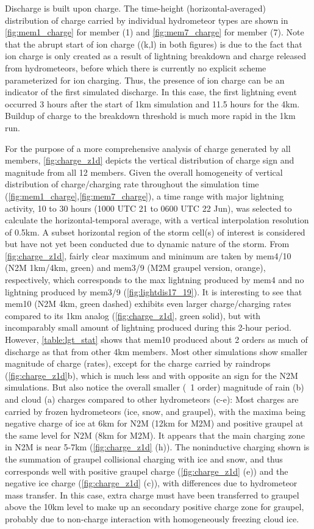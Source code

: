 Discharge is built upon charge. The time-height (horizontal-averaged) distribution of charge carried by individual hydrometeor types are shown in \ref{fig:mem1_charge} for member (1) and \ref{fig:mem7_charge} for member (7). Note that the abrupt start of ion charge ((k,l) in both figures) is due to the fact that ion charge is only created as a result of lightning breakdown and charge released from hydrometeors, before which there is currently no explicit scheme parameterized for ion charging. Thus, the presence of ion charge can be an indicator of the first simulated discharge. In this case, the first lightning event occurred 3 hours after the start of 1km simulation and 11.5 hours for the 4km. Buildup of charge to the breakdown threshold is much more rapid in the 1km run.

For the purpose of a more comprehensive analysis of charge generated by all members, \ref{fig:charge_z1d} depicts the vertical distribution of charge sign and magnitude from all 12 members. Given the overall homogeneity of vertical distribution of charge/charging rate throughout the simulation time (\ref{fig:mem1_charge},\ref{fig:mem7_charge}), a time range with major lightning activity, 10 to 30 hours (1000 UTC 21 to 0600 UTC 22 Jun), was selected to calculate the horizontal-temporal average, with a vertical interpolation resolution of 0.5km. A subset horizontal region of the storm cell(s) of interest is considered but have not yet been conducted due to dynamic nature of the storm. From \ref{fig:charge_z1d}, fairly clear maximum and minimum are taken by mem4/10 (N2M 1km/4km, green) and mem3/9 (M2M graupel version, orange), respectively, which corresponds to the max lightning produced by mem4 and no lightning produced by mem3/9  (\ref{fig:lightdis17_19}). It is interesting to see that mem10 (N2M 4km, green dashed) exhibits even larger charge/charging rates compared to its 1km analog (\ref{fig:charge_z1d}, green solid), but with incomparably small amount of lightning produced during this 2-hour period. However, \ref{table:lgt_stat} shows that mem10 produced about 2 orders as much of discharge as that from other 4km members. Most other simulations show smaller magnitude of charge (rates), except for the charge carried by raindrops (\ref{fig:charge_z1d}b), which is much less and with opposite an sign for the N2M simulations. But also notice the overall smaller (~1 order) magnitude of rain (b) and cloud (a) charges compared to other hydrometeors (c-e): Most charges are carried by frozen hydrometeors (ice, snow, and graupel), with the maxima being negative charge of ice at 6km for N2M (12km for M2M) and positive graupel at the same level for N2M (8km for M2M). It appears that the main charging zone in N2M is near 5-7km (\ref{fig:charge_z1d} (h)). The noninductive charging shown is the summation of graupel collisional charging with ice and snow, and thus corresponds well with positive graupel charge (\ref{fig:charge_z1d} (e)) and the negative ice charge (\ref{fig:charge_z1d} (c)), with differences due to hydrometeor mass transfer. In this case, extra charge must have been transferred to graupel above the 10km level to make up an secondary positive charge zone for graupel, probably due to non-charge interaction with homogeneously freezing cloud ice. 